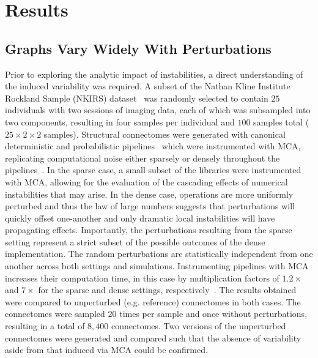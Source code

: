 \documentclass[10pt,letterpaper]{article}
\begin{document}
\section*{Results}
\subsection*{Graphs Vary Widely With Perturbations}

Prior to exploring the analytic impact of instabilities, a direct understanding of
the induced variability was required. A subset of the Nathan Kline Institute Rockland
Sample (NKIRS) dataset~\cite{Nooner2012-eg} was randomly selected to contain $25$
individuals with two sessions of imaging data, each of which was subsampled into two
components, resulting in four samples per individual and $100$ samples total
($25 \times 2 \times 2$ samples). Structural connectomes were generated with canonical
deterministic and probabilistic pipelines~\cite{Garyfallidis2014-ql,Garyfallidis2012-gg}
which were instrumented with MCA, replicating computational noise either sparsely or
densely throughout the pipelines~\cite{Denis2016-wo,Kiar2020-lb}. In the sparse case,
a small subset of the libraries were instrumented with MCA, allowing for the
evaluation of the cascading effects of numerical instabilities that may arise. In the
dense case, operations are more uniformly perturbed and thus the law of large numbers
suggests that perturbations will quickly offset one-another and only dramatic local
instabilities will have propagating effects. Importantly, the perturbations resulting
from the sparse setting represent a strict subset of the possible outcomes of the
dense implementation. The random perturbations are statistically independent from one
another across both settings and simulations. Instrumenting pipelines with MCA
increases their computation time, in this case by multiplication factors of
$1.2 \times$ and $7 \times$ for the sparse and dense settings,
respectively~\cite{Kiar2020-lb}. The results obtained were compared to unperturbed
(e.g. reference) connectomes in both cases. The connectomes were sampled $20$ times
per sample and once without perturbations, resulting in a total of $8,400$ connectomes.
Two versions of the unperturbed connectomes were generated and compared such that the
absence of variability aside from that induced via MCA could be confirmed.
\end{document}
